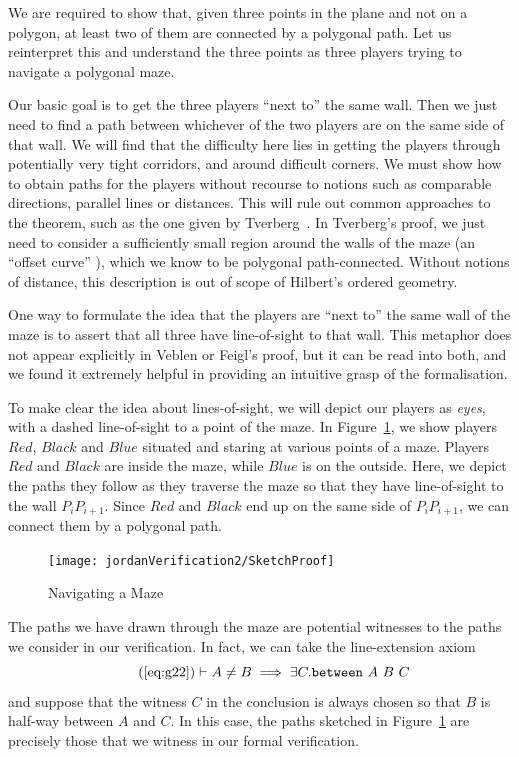 We are required to show that, given three points in the plane and not on a polygon, at least two of them are connected by a polygonal path. Let us reinterpret this and understand the three points as three players trying to navigate a polygonal maze.

Our basic goal is to get the three players ``next to'' the same wall. Then we just need to find a path between whichever of the two players are on the same side of that wall. We will find that the difficulty here lies in getting the players through potentially very tight corridors, and around difficult corners. We must show how to obtain paths for the players without recourse to notions such as comparable directions, parallel lines or distances. This will rule out common approaches to the theorem, such as the one given by Tverberg~\cite{TverbergJordan}. In Tverberg's proof, we just need to consider a sufficiently small region around the walls of the maze (an ``offset curve'' ), which we know to be polygonal path-connected. Without notions of distance, this description is out of scope of Hilbert's ordered geometry.

One way to formulate the idea that the players are ``next to'' the same wall of the maze is to assert that all three have line-of-sight to that wall. This metaphor does not appear explicitly in Veblen or Feigl's proof, but it can be read into both, and we found it extremely helpful in providing an intuitive grasp of the formalisation.

To make clear the idea about lines-of-sight, we will depict our players as \emph{eyes}, with a dashed line-of-sight to a point of the maze. In Figure~\ref{fig:SketchProofJordan2}, we show players $Red$, $Black$ and $Blue$ situated and staring at various points of a maze. Players $Red$ and $Black$ are inside the maze, while $Blue$ is on the outside. Here, we depict the paths they follow as they traverse the maze so that they have line-of-sight to the wall $P_iP_{i+1}$. Since $Red$ and $Black$ end up on the same side of $P_iP_{i+1}$, we can connect them by a polygonal path.

\begin{figure}
  \centering\texttt{[image: jordanVerification2/SketchProof]}
  \caption{Navigating a Maze}
  \label{fig:SketchProofJordan2}
\end{figure}

The paths we have drawn through the maze are potential witnesses to the paths we consider in our verification. In fact, we can take the line-extension axiom 
\begin{equation}
  \tag{\ref{eq:g22}}
  \vdash A \neq B \implies \exists C. \between{A}{B}{C}
\end{equation}
and suppose that the witness $C$ in the conclusion is always chosen so that $B$ is half-way between $A$ and $C$. In this case, the paths sketched in Figure~\ref{fig:SketchProofJordan2} are precisely those that we witness in our formal verification.

